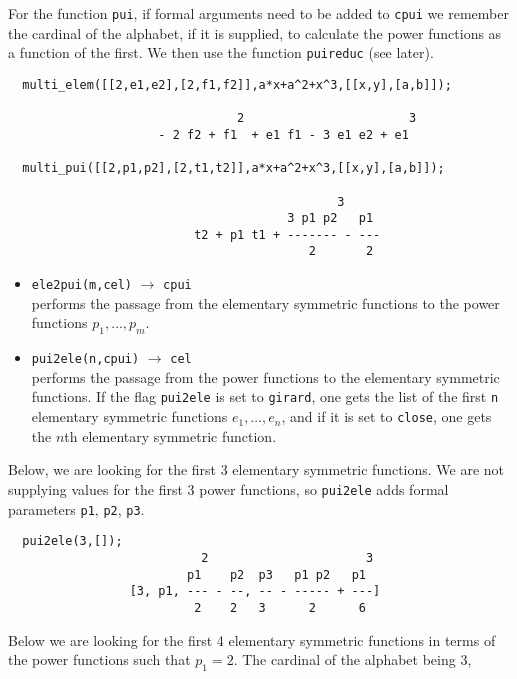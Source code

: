 \documentclass[11pt]{article}
\begin{document}
For the function \texttt{pui}, if formal arguments need to be added to
\texttt{cpui} we remember the cardinal of the alphabet, if it is supplied, to
calculate the power functions as a function of the first.  We then use the
function \texttt{puireduc} (see later).
\small
\begin{verbatim}
  multi_elem([[2,e1,e2],[2,f1,f2]],a*x+a^2+x^3,[[x,y],[a,b]]);

                                2                       3
                     - 2 f2 + f1  + e1 f1 - 3 e1 e2 + e1

  multi_pui([[2,p1,p2],[2,t1,t2]],a*x+a^2+x^3,[[x,y],[a,b]]);
    
                                              3
                                       3 p1 p2   p1
                          t2 + p1 t1 + ------- - ---
                                          2       2
\end{verbatim}
\normalsize
\begin{itemize}
  \item \texttt{ele2pui(m,cel)} 
    $\longrightarrow$ \texttt{cpui} \\
    performs the passage from the elementary symmetric functions to the power
    functions $p_1,\ldots,p_m$.
  \item \texttt{pui2ele(n,cpui)} 
      $\longrightarrow$ \texttt{cel} \\
      performs the passage from the power functions to the elementary symmetric
      functions.  If the flag \texttt{pui2ele} is set to \texttt{girard}, one gets
      the list of the first \texttt{n} elementary symmetric functions
      $e_1,\dots,e_n$, and if it is set to \texttt{close}, one gets the $n$th
      elementary symmetric function.
\end{itemize}
Below, we are looking for the first 3 elementary symmetric functions.  We are
not supplying values for the first 3 power functions, so \texttt{pui2ele} adds
formal parameters \texttt{p1}, \texttt{p2}, \texttt{p3}.
\small
\begin{verbatim}
  pui2ele(3,[]);
                           2                      3
                         p1    p2  p3   p1 p2   p1
                 [3, p1, --- - --, -- - ----- + ---]
                          2    2   3      2      6
\end{verbatim}
\normalsize
Below we are looking for the first 4 elementary symmetric functions in terms of
the power functions such that $p_1=2$.  The cardinal of the alphabet being 3,
\end{document}

